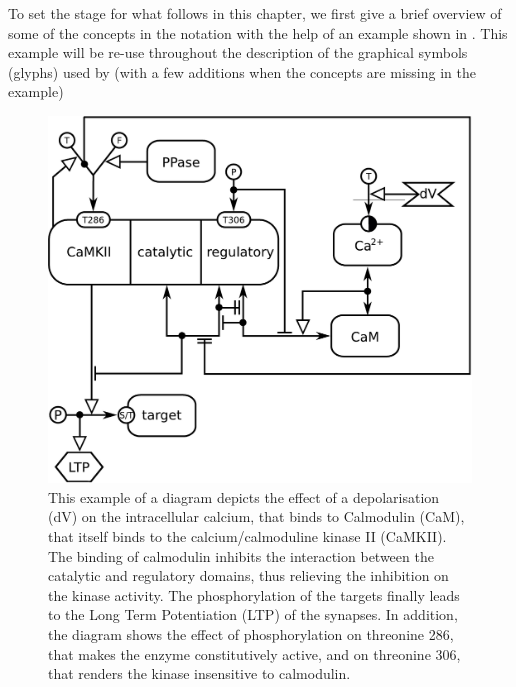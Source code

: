 
To set the stage for what follows in this chapter, we first give a brief overview of some of the concepts in the \ER notation with the help of an example shown in . This example will be re-use throughout the description of the graphical symbols (glyphs) used by \SBGNERLone (with a few additions when the concepts are missing in the example) 

\begin{figure}[H]
  \centering
  \vspace*{-0.75em}
  \includegraphics[scale=0.6]{examples/CaMKII-intro}
   \caption{This example of a \ER diagram depicts the effect of a depolarisation (dV) on the intracellular calcium, that binds to Calmodulin (CaM), that itself binds to the calcium/calmoduline kinase II (CaMKII). The binding of calmodulin inhibits the interaction between the catalytic and regulatory domains, thus relieving the inhibition on the kinase activity. The phosphorylation of the targets finally leads to the Long Term Potentiation (LTP) of the synapses. In addition, the diagram shows the effect of phosphorylation on threonine 286, that makes the enzyme constitutively active, and on threonine 306, that renders the kinase insensitive to calmodulin.}
  \label{fig:eg1}
\end{figure}
 
